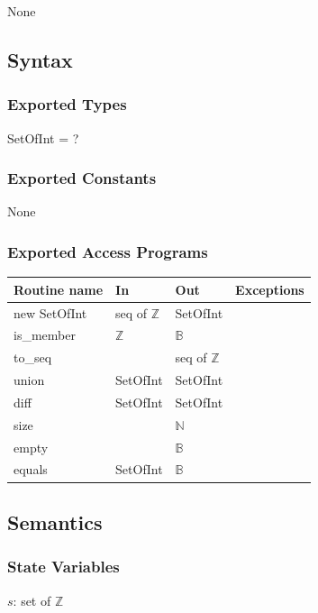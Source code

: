\documentclass[12pt,fleqn]{examtst}
\begin{document}
None

\subsection* {Syntax}

\subsubsection* {Exported Types}

SetOfInt = ?

\subsubsection* {Exported Constants}

None

\subsubsection* {Exported Access Programs}

\begin{tabular}{| l | l | l | p{6cm} |}
\hline
\textbf{Routine name} & \textbf{In} & \textbf{Out} & \textbf{Exceptions}\\
\hline
new SetOfInt & seq of $\mathbb{Z}$ & SetOfInt & \\
\hline
is\_member & $\mathbb{Z}$ & $\mathbb{B}$ & \\
\hline
to\_seq &  & seq of $\mathbb{Z}$ & \\
\hline
union & SetOfInt & SetOfInt & \\
\hline
diff & SetOfInt & SetOfInt & \\
\hline
size &  & $\mathbb{N}$ & \\
\hline
empty &  & $\mathbb{B}$ & \\
\hline
equals & SetOfInt & $\mathbb{B}$ & \\
\hline

\end{tabular}

\subsection* {Semantics}

\subsubsection* {State Variables}

$s$: set of $\mathbb{Z}$
\end{document}
